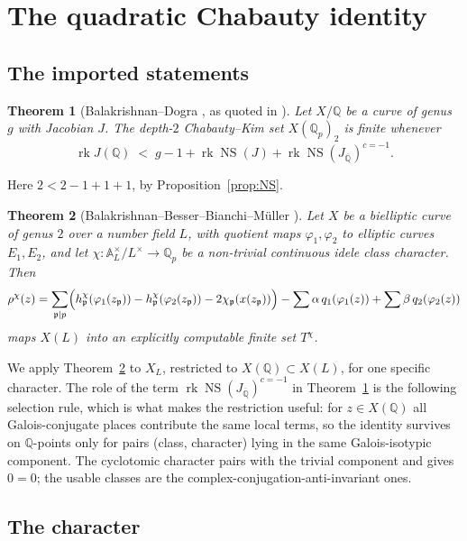 \documentclass[11pt,reqno]{amsart}
\theoremstyle{plain}
\newtheorem{theorem}{Theorem}[section]
\theoremstyle{definition}
\newcommand{\Q}{\mathbb{Q}}
\newcommand{\Ad}{\mathbb{A}}
\newcommand{\Qbar}{\overline{\Q}}
\newcommand{\pp}{\mathfrak{p}}
\DeclareMathOperator{\NS}{NS}
\DeclareMathOperator{\rk}{rk}
\numberwithin{equation}{section}
\begin{document}
\section{The quadratic Chabauty identity}\label{sec:identity}

\subsection{The imported statements}

\begin{theorem}[Balakrishnan--Dogra {\cite[Prop.~2]{BDii}}, as quoted in {\cite{Dogra}}]
\label{thm:BD}
Let $X/\Q$ be a curve of genus $g$ with Jacobian $J$. The depth-$2$
Chabauty--Kim set $X(\Q_{p})_{2}$ is finite whenever
\[
  \rk J(\Q)\;<\;g-1+\rk\NS(J)+\rk\NS(J_{\Qbar})^{c=-1}.
\]
\end{theorem}

Here $2<2-1+1+1$, by Proposition~\ref{prop:NS}.

\begin{theorem}[Balakrishnan--Besser--Bianchi--M\"uller {\cite[Thm.~1.5]{BBBM}}]
\label{thm:BBBM}
Let $X$ be a bielliptic curve of genus $2$ over a number field $L$, with
quotient maps $\varphi_{1},\varphi_{2}$ to elliptic curves $E_{1},E_{2}$, and let
$\chi\colon \Ad_{L}^{\times}/L^{\times}\to\Q_{p}$ be a non-trivial continuous
idele class character. Then
\[
  \rho^{\chi}(z)=\sum_{\pp\mid p}\Bigl(h^{\chi}_{\pp}(\varphi_{1}(z_{\pp}))
   -h^{\chi}_{\pp}(\varphi_{2}(z_{\pp}))-2\chi_{\pp}(x(z_{\pp}))\Bigr)
   -\sum\alpha\, q_{1}(\varphi_{1}(z))+\sum\beta\, q_{2}(\varphi_{2}(z))
\]
maps $X(L)$ into an explicitly computable finite set $T^{\chi}$.
\end{theorem}

We apply Theorem~\ref{thm:BBBM} to $X_{L}$, restricted to
$X(\Q)\subset X(L)$, for one specific character. The role of the term
$\rk\NS(J_{\Qbar})^{c=-1}$ in Theorem~\ref{thm:BD} is the following selection
rule, which is what makes the restriction useful: for $z\in X(\Q)$ all
Galois-conjugate places contribute the same local terms, so the identity
survives on $\Q$-points only for pairs (class, character) lying in the same
Galois-isotypic component. The cyclotomic character pairs with the trivial
component and gives $0=0$; the usable classes are the
complex-conjugation-anti-invariant ones.

\subsection{The character}
\end{document}
